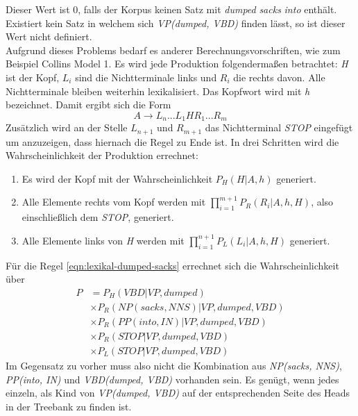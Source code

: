 Dieser Wert ist 0, falls der Korpus keinen Satz mit \textit{dumped} \textit{sacks} \textit{into} enthält. Existiert kein Satz in welchem sich \textit{VP(dumped, VBD)} finden lässt, so ist dieser Wert nicht definiert. \\
Aufgrund dieses Problems bedarf es anderer Berechnungsvorschriften, wie zum Beispiel Collins Model 1. %
Es wird jede Produktion folgendermaßen betrachtet: \textit{H} ist der Kopf, \( L_i \) sind die Nichtterminale links und \( R_i \) die rechts davon. Alle Nichtterminale bleiben weiterhin lexikalisiert. Das Kopfwort wird mit \textit{h} bezeichnet. Damit ergibt sich die Form
\[ A \to L_n...L_1 H R_1...R_m \]
Zusätzlich wird an der Stelle \( L_{n+1} \) und \( R_{m+1} \) das Nichtterminal \textit{STOP} eingefügt um anzuzeigen, dass hiernach die Regel zu Ende ist. In drei Schritten wird die Wahrscheinlichkeit der Produktion errechnet:
\begin{enumerate}
\item Es wird der Kopf mit der Wahrscheinlichkeit \( P_H(H | A, h) \) generiert.
\item Alle Elemente rechts vom Kopf werden mit \( \displaystyle\prod_{i = 1}^{m+1} P_R(R_i | A, h, H) \), also einschließlich dem \textit{STOP}, generiert.
\item Alle Elemente links von \textit{H} werden mit \( \displaystyle\prod_{i = 1}^{n+1} P_L(L_i | A, h, H) \) generiert.
\end{enumerate}
Für die Regel \ref{eqn:lexikal-dumped-sacks} errechnet sich die Wahrscheinlichkeit über
\begin{align}
P & = P_H(VBD|VP, dumped) \nonumber \\ & \times P_R(NP(sacks, NNS)|VP, dumped, VBD) \nonumber \\ & \times P_R(PP(into, IN)|VP, dumped, VBD) \nonumber \\ & \times P_R(STOP|VP, dumped, VBD) \nonumber \\ & \times P_L(STOP|VP, dumped, VBD)
\end{align}
Im Gegensatz zu vorher muss also nicht die Kombination aus \textit{NP(sacks, NNS)}, \textit{PP(into, IN)} und \textit{VBD(dumped, VBD)} vorhanden sein. Es genügt, wenn jedes einzeln, als Kind von \textit{VP(dumped, VBD)} auf der entsprechenden Seite des Heads in der Treebank zu finden ist. %
